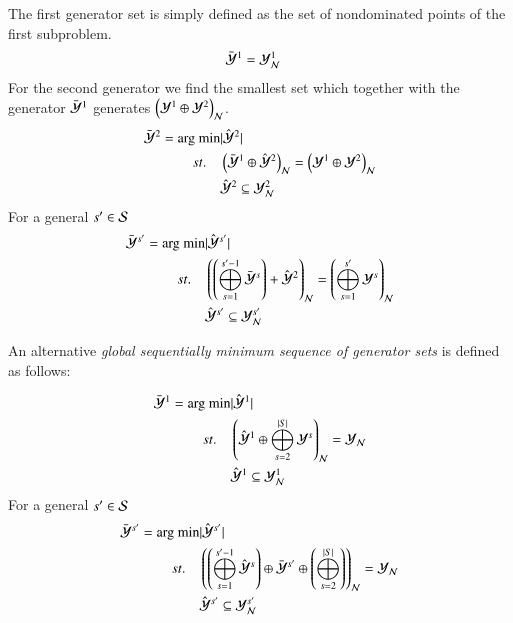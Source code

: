 \begin{enumerate}
The first generator set is simply defined as the set of nondominated points of the first subproblem.
\begin{align}
    \bY^1  &= \Yn^1
\end{align}
For the second generator we find the smallest set which together with the generator $\bY^1$ generates $\left( \Y^1 \+ \Y^2 \right)_\mcN$.
\begin{align}
    \bY^2 = \text{arg min} &\lvert \hY^2 \rvert \\ 
    st. \quad& \left( \bY^1 \+ \hY^2 \right)_\mcN = \left( \Y^1 \+ \Y^2 \right)_\mcN  \nonumber  \\
	     & \hY^2 \subseteq \Yn^2
\end{align}
For a general $s' \in \S$
\begin{align}
    \bY^{s'} = \text{arg min} &\lvert \hY^{s'} \rvert \\ 
    st. \quad& \left( \left( \msum_{s = 1}^{s'-1} \bY^s \right)  + \hY^2 \right)_\mcN = \left( \msum_{s=1}^{s'} \Y^s \right)_\mcN  \nonumber  \\
	     & \hY^{s'} \subseteq \Yn^{s'}
\end{align}

An alternative \emph{global sequentially minimum sequence of generator sets} is defined as follows:

\begin{align}
    \bY^1  =  \text{arg min} &\lvert \hY^1 \rvert \\ 
    st. \quad& \left( \hY^1 \+ \msum_{s=2}^{\abs{S}} \Y^s \right)_\mcN = \Yn  \nonumber  \\
	     & \hY^1 \subseteq \Yn^1
\end{align}
For a general $s' \in \S$
\begin{align}
    \bY^{s'} = \text{arg min} &\lvert \hY^{s'} \rvert \\ 
    st. \quad& \left( \left(\msum_{s = 1}^{s'-1} \hY^s \right) \+ \bY^{s'} \+ \left(\msum_{s=2}^{\abs{S}} \right)\right)_\mcN = \Yn  \nonumber  \\
	     & \hY^{s'} \subseteq \Yn^{s'}
\end{align}





\end{enumerate}




